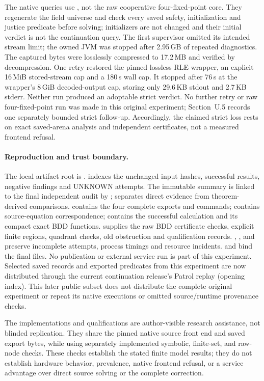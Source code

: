 The native queries use , not the raw cooperative
four-fixed-point core. They regenerate the field universe and check every
saved safety, initialization and justice predicate before solving;
initializers are not changed and their initial verdict is not the
continuation query. The first supervisor omitted its intended stream
limit; the owned JVM was stopped after 2.95\,GB of repeated diagnostics.
The captured bytes were losslessly compressed to 17.2\,MB and verified
by decompression. One retry restored the pinned lossless RLE wrapper,
an explicit 16\,MiB stored-stream cap and a 180\,s wall cap. It stopped
after 76\,s at the wrapper's 8\,GiB decoded-output cap, storing only
29.6\,KB stdout and 2.7\,KB stderr. Neither run produced an adoptable
strict verdict. No further retry or raw four-fixed-point run was made
in this original experiment; Section~U.5 records one separately bounded
strict follow-up.
Accordingly, the claimed strict loss rests on exact saved-arena analysis
and independent certificates, not a measured frontend refusal.

\paragraph{Reproduction and trust boundary.}
The local artifact root is
.
 indexes the unchanged input hashes, successful
results, negative findings and UNKNOWN attempts. The immutable summary
is linked to the final independent audit by
; 
separates direct evidence from theorem-derived comparisons.
 contains the four complete exports and commands;
 contains source-equation correspondence;
 contains the successful calculation and its
compact exact BDD functions.  supplies the raw
BDD certificate checks, explicit finite regions, quadrant checks, old
obstruction and qualification records. , ,
 and  preserve incomplete attempts,
process timings and resource incidents.  and
 bind the final files. No publication or external service
run is part of this experiment.
Selected saved records and exported
predicates from this experiment are now distributed through the current
continuation release's Patrol replay (opening index). This later public
subset does not distribute the complete original experiment or repeat its
native executions or omitted source/runtime provenance checks.

The implementations and qualifications are author-visible research
assistance, not blinded replication. They share the pinned native source
front end and saved export bytes, while using separately implemented
symbolic, finite-set, and raw-node checks. These checks establish the
stated finite model results; they do not establish hardware behavior,
prevalence, native frontend refusal, or a service advantage over direct
source solving or the complete correction.
